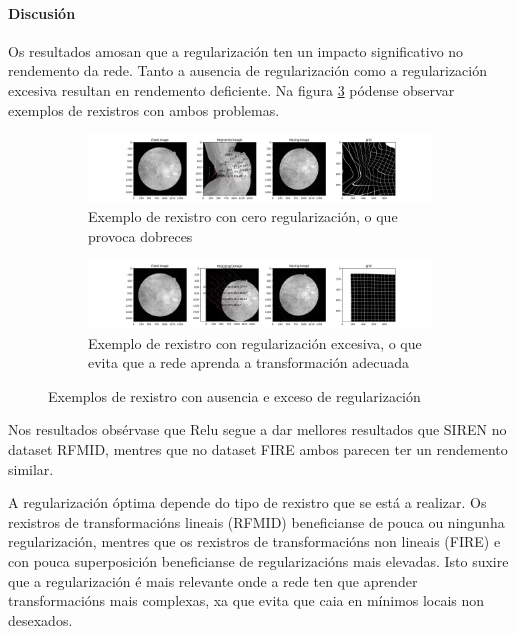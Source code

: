 \FloatBarrier

\paragraph{Discusión}
\label{par:Discusion-regularization}

Os resultados amosan que a regularización ten un impacto significativo no rendemento da rede. Tanto a ausencia de regularización como a regularización excesiva resultan en rendemento deficiente.
Na figura \ref{fig:regularization_examples} pódense observar exemplos de rexistros con ambos problemas.

\begin{figure}[ht]
    \centering
    \begin{subfigure}[b]{0.45\textwidth}
        \centering
        \includegraphics[width=\textwidth]{imaxes/reg_examples/no_reg_example.png}
        \caption{Exemplo de rexistro con cero regularización, o que provoca dobreces}
        \label{fig:no_reg_example}
    \end{subfigure}\hfill
    \begin{subfigure}[b]{0.45\textwidth}
        \centering
        \includegraphics[width=\textwidth]{imaxes/reg_examples/too_much_reg_example.png}
        \caption{Exemplo de rexistro con regularización excesiva, o que evita que a rede aprenda a transformación adecuada}
        \label{fig:too_much_reg_example}
    \end{subfigure}
    \caption{Exemplos de rexistro con ausencia e exceso de regularización}
    \label{fig:regularization_examples}
\end{figure}

Nos resultados obsérvase que Relu segue a dar mellores resultados que SIREN no dataset RFMID, mentres que no dataset FIRE ambos parecen ter un rendemento similar.

A regularización óptima depende do tipo de rexistro que se está a realizar. Os rexistros de transformacións lineais (RFMID) beneficianse de pouca ou ningunha regularización, mentres que os rexistros de transformacións non lineais (FIRE) e con pouca superposición beneficianse de regularizacións mais elevadas.
Isto suxire que a regularización é mais relevante onde a rede ten que aprender transformacións mais complexas, xa que evita que caia en mínimos locais non desexados.

